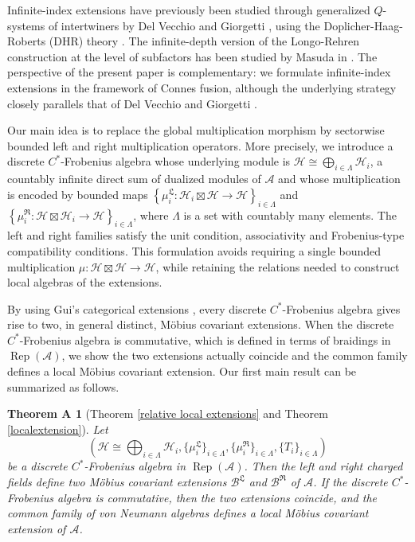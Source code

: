 \documentclass{article}
\newtheorem*{theoremA}{Theorem A}
\newcommand{\hilb}{\mathcal{H}}
\newcommand{\A}{\mathcal{A}}
\begin{document}
Infinite-index extensions have previously been studied through generalized $Q$-systems of intertwiners by Del Vecchio and Giorgetti \cite{del2018infinite}, using the Doplicher-Haag-Roberts (DHR) theory \cite{fredenhagen1989superselection,fredenhagen1992superselection}. The infinite-depth version of the Longo-Rehren construction \cite{longo1995nets} at 
the level of subfactors has been studied by Masuda in \cite{masuda2000generalization}. 
The perspective of the 
present paper is complementary: we formulate infinite-index extensions in the framework of Connes fusion,
although the underlying strategy closely parallels that of Del Vecchio and Giorgetti \cite{del2018infinite}.


Our main idea is to replace the global multiplication morphism by sectorwise bounded left and right multiplication operators. More precisely, we introduce a discrete $C^*$-Frobenius algebra whose 
underlying module is $\hilb \cong \bigoplus_{i\in\Lambda}\hilb_i$,  a countably infinite direct sum of dualized modules of $\A$ and 
whose multiplication is encoded by bounded maps $\left\{ \mu_i^{\mathfrak{L}}: \hilb_i\boxtimes\hilb \to \hilb \right\}_{i\in\Lambda}$ and $\left\{ \mu_i^{\mathfrak{R}} : \hilb\boxtimes \hilb_i \to \hilb \right\}_{i\in\Lambda}$, where $\Lambda$ is a set with countably many elements.
The left and right families satisfy the unit condition, associativity and Frobenius-type compatibility conditions. 
This formulation avoids requiring a single bounded multiplication 
$\mu: \hilb\boxtimes\hilb \to \hilb$, while retaining the relations needed to construct local algebras of the extensions.

By using Gui's categorical extensions \cite{gui2021categorical}, every discrete \(C^*\)-Frobenius algebra gives rise to two, in general distinct, M\"{o}bius covariant extensions. When the discrete 
$C^*$-Frobenius algebra is commutative, which is defined in terms of braidings in $\operatorname{Rep}(\A)$, we show the two extensions actually coincide and the common family defines a 
local M\"{o}bius covariant extension. Our first main result can be summarized as follows.

\begin{theoremA}[Theorem \ref{relative local extensions} and Theorem \ref{localextension}]
Let
\[
    \left(
    \mathcal H \cong \bigoplus_{i\in\Lambda}\mathcal H_i,
    \{\mu_i^\mathfrak{L}\}_{i\in\Lambda},
    \{\mu_i^\mathfrak{R}\}_{i\in\Lambda},
    \{T_i\}_{i\in\Lambda}
    \right)
\]
be a discrete \(C^*\)-Frobenius algebra in
\(\operatorname{Rep}(\mathcal A)\).
Then the left and right charged fields define two M\"{o}bius covariant
extensions \(\mathcal B^\mathfrak{L}\) and \(\mathcal B^\mathfrak{R}\) of \(\mathcal A\).
If the discrete \(C^*\)-Frobenius algebra is commutative, then
the two extensions coincide, and the common family of von Neumann algebras defines a local M\"{o}bius covariant extension of \(\mathcal A\).
\end{theoremA}
\end{document}
